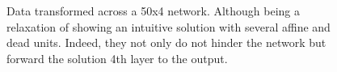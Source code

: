 \begin{figure}
{{    %
    }
    \parbox{.195\textwidth}{%
    }
  }
    \caption{Data transformed across a 50x4 \SepLayer network. Although being a relaxation of \SepUnitPoint showing an intuitive solution with several affine and dead units. Indeed, they not only do not hinder the network but forward the solution 4th layer to the output.}
    \label{fig:moonsLayerwise}
\end{figure}

